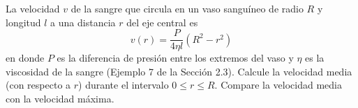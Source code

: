 \item La velocidad $v$ de la sangre que circula en un vaso sanguíneo de radio $R$ y longitud $l$ a una distancia $r$ del eje central es
$$v(r) = \frac{P}{4\eta l}(R^2 - r^2)$$
en donde $P$ es la diferencia de presión entre los extremos del vaso y $\eta$ es la viscosidad de la sangre (Ejemplo 7 de la Sección 2.3). Calcule la velocidad media (con respecto a $r$) durante el intervalo $0 \le r \le R$. Compare la velocidad media con la velocidad máxima.
